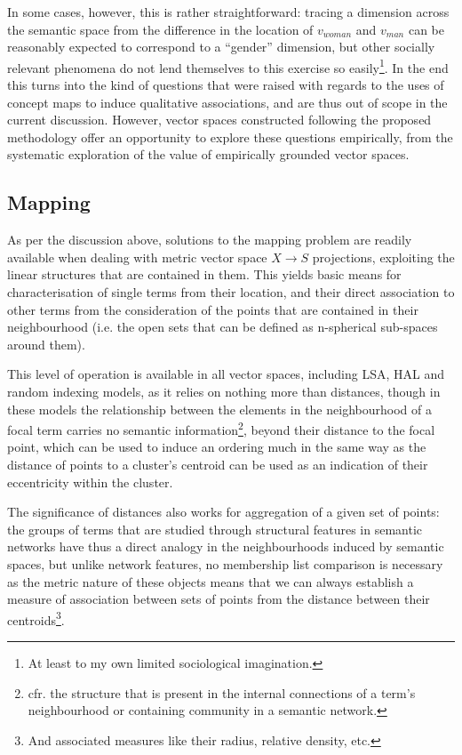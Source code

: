 In some cases, however, this is rather straightforward: tracing a dimension across the semantic space from the difference in the location of $v_{woman}$ and $v_{man}$ can be reasonably expected to correspond to a ``gender'' dimension, but other socially relevant phenomena do not lend themselves to this exercise so easily\footnote{
    At least to my own limited sociological imagination.
}.
In the end this turns into the kind of questions that were raised with regards to the uses of concept maps to induce qualitative associations, and are thus out of scope in the current discussion.
However, vector spaces constructed following the proposed methodology offer an opportunity to explore these questions empirically, from the systematic exploration of the value of empirically grounded vector spaces.

\subsection{Mapping}

As per the discussion above, solutions to the mapping problem are readily available when dealing with metric vector space $X \rightarrow S$ projections, exploiting the linear structures that are contained in them.
This yields basic means for characterisation of single terms from their location, and their direct association to other terms from the consideration of the points that are contained in their neighbourhood (i.e. the open sets that can be defined as n-spherical sub-spaces around them).

This level of operation is available in all vector spaces, including LSA, HAL and random indexing models, as it relies on nothing more than distances, though in these models the relationship between the elements in the neighbourhood of a focal term carries no semantic information\footnote{
    cfr. the structure that is present in the internal connections of a term's neighbourhood or containing community in a semantic network.
}, beyond their distance to the focal point, which can be used to induce an ordering much in the same way as the distance of points to a cluster's centroid can be used as an indication of their eccentricity within the cluster.

The significance of distances also works for aggregation of a given set of points: the groups of terms that are studied through structural features in semantic networks have thus a direct analogy in the neighbourhoods induced by semantic spaces, but unlike network features, no membership list comparison is necessary as the metric nature of these objects means that we can always establish a measure of association between sets of points from the distance between their centroids\footnote{
    And associated measures like their radius, relative density, etc.
}.

